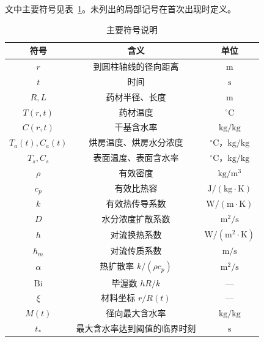 文中主要符号见表~\ref{tab:symbols}。未列出的局部记号在首次出现时定义。

\begin{table}[htbp]
\centering
\caption{主要符号说明}
\label{tab:symbols}
\begin{tabular}{ccc}
\toprule
\textbf{符号} & \textbf{含义} & \textbf{单位} \\
\midrule
$r$ & 到圆柱轴线的径向距离 & $\mathrm{m}$ \\
$t$ & 时间 & $\mathrm{s}$ \\
$R,L$ & 药材半径、长度 & $\mathrm{m}$ \\
$T(r,t)$ & 药材温度 & $^\circ\mathrm{C}$ \\
$C(r,t)$ & 干基含水率 & $\mathrm{kg/kg}$ \\
$T_a(t),C_a(t)$ & 烘房温度、烘房水分浓度 & $^\circ\mathrm{C}$，$\mathrm{kg/kg}$ \\
$T_s,C_s$ & 表面温度、表面含水率 & $^\circ\mathrm{C}$，$\mathrm{kg/kg}$ \\
$\rho$ & 有效密度 & $\mathrm{kg/m^3}$ \\
$c_p$ & 有效比热容 & $\mathrm{J/(kg\cdot K)}$ \\
$k$ & 有效热传导系数 & $\mathrm{W/(m\cdot K)}$ \\
$D$ & 水分浓度扩散系数 & $\mathrm{m^2/s}$ \\
$h$ & 对流换热系数 & $\mathrm{W/(m^2\cdot K)}$ \\
$h_m$ & 对流传质系数 & $\mathrm{m/s}$ \\
$\alpha$ & 热扩散率 $k/(\rho c_p)$ & $\mathrm{m^2/s}$ \\
$\mathrm{Bi}$ & 毕渥数 $hR/k$ & --- \\
$\xi$ & 材料坐标 $r/R(t)$ & --- \\
$M(t)$ & 径向最大含水率 & $\mathrm{kg/kg}$ \\
$t_*$ & 最大含水率达到阈值的临界时刻 & $\mathrm{s}$ \\
\bottomrule
\end{tabular}
\end{table}
